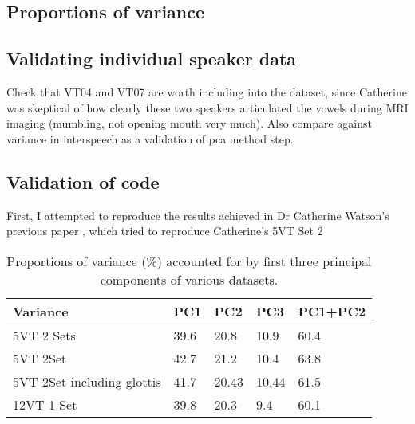 \subsection{Proportions of variance}

\subsection{Validating individual speaker data}

Check that VT04 and VT07 are worth including into the dataset, since Catherine was skeptical of how clearly these two speakers articulated the vowels during MRI imaging (mumbling, not opening mouth very much). Also compare against variance in interspeech as a validation of pca method step.

\subsection{Validation of code}

First, I attempted to reproduce the results achieved in Dr Catherine Watson's previous paper \cite{watson2014mappings}, which 
tried to reproduce Catherine's 5VT Set 2

\begin{table}[H]
\centering
\caption{Proportions of variance (\%) accounted for by first three principal components of various datasets.}
\label{variance}
\begin{tabular}{|l|l|l|l|l|}
\hline
\textbf{Variance} & \textbf{PC1}   & \textbf{PC2}   & \textbf{PC3}   & \textbf{PC1+PC2}  \\ \hline
5VT 2 Sets \cite{watson2014mappings}  & 39.6           & 20.8           & 10.9           & 60.4              \\ \hline    
5VT 2Set          & 42.7           & 21.2           & 10.4           & 63.8              \\ \hline
5VT 2Set including glottis      & 41.7           & 20.43           & 10.44           & 61.5\\ \hline
12VT 1 Set         & 39.8           & 20.3           & 9.4           & 60.1              \\ \hline
\end{tabular}
\end{table}
